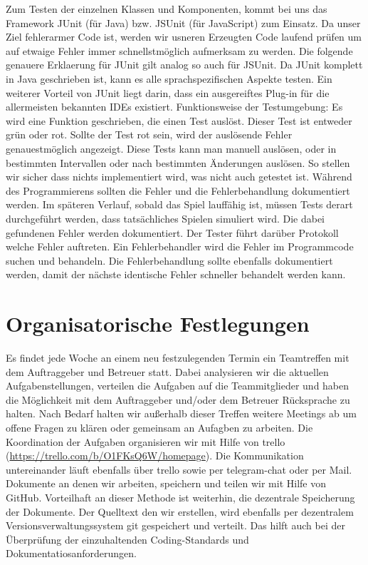 \documentclass[11pt,a4paper]{article}
\begin{document}
Zum Testen der einzelnen Klassen und Komponenten, kommt bei uns das Framework JUnit (für Java) bzw. JSUnit (für JavaScript) zum Einsatz. Da unser Ziel fehlerarmer Code ist, werden wir usneren Erzeugten Code laufend prüfen um auf etwaige Fehler immer schnellstmöglich aufmerksam zu werden. 
Die folgende genauere Erklaerung für JUnit gilt analog so auch für JSUnit.
Da JUnit komplett in Java geschrieben ist, kann es alle sprachspezifischen Aspekte testen. Ein weiterer Vorteil von JUnit liegt darin, dass ein ausgereiftes Plug-in für die allermeisten bekannten IDEs existiert. Funktionsweise der Testumgebung: Es wird eine Funktion geschrieben, die einen Test auslöst. Dieser Test ist entweder grün oder rot. Sollte der Test rot sein, wird der auslösende Fehler genauestmöglich angezeigt. Diese Tests kann man manuell auslösen, oder in bestimmten Intervallen oder nach bestimmten Änderungen auslösen. So stellen wir sicher dass nichts implementiert wird, was nicht auch getestet ist. Während des Programmierens sollten die Fehler und die Fehlerbehandlung dokumentiert werden.
Im späteren Verlauf, sobald das Spiel lauffähig ist, müssen Tests derart durchgeführt werden, dass tatsächliches Spielen simuliert wird. Die dabei gefundenen Fehler werden dokumentiert. Der Tester führt darüber Protokoll welche Fehler auftreten. Ein Fehlerbehandler wird die Fehler im Programmcode suchen und behandeln. Die Fehlerbehandlung sollte ebenfalls dokumentiert werden, damit der nächste identische Fehler schneller behandelt werden kann. 

\section{Organisatorische Festlegungen}

Es findet jede Woche an einem neu festzulegenden Termin ein Teamtreffen mit dem Auftraggeber und Betreuer statt. Dabei analysieren wir die aktuellen Aufgabenstellungen, verteilen die Aufgaben auf die Teammitglieder und haben die Möglichkeit mit dem Auftraggeber und/oder dem Betreuer Rücksprache zu halten. Nach Bedarf halten wir außerhalb dieser Treffen weitere Meetings ab um offene Fragen zu klären oder gemeinsam an Aufagben zu arbeiten. Die Koordination der Aufgaben organisieren wir mit Hilfe von trello (\url{https://trello.com/b/O1FKsQ6W/homepage}). Die Kommunikation untereinander läuft ebenfalls über trello sowie per telegram-chat oder per Mail. Dokumente an denen wir arbeiten, speichern und teilen wir mit Hilfe von GitHub. Vorteilhaft an dieser Methode ist weiterhin, die dezentrale Speicherung der Dokumente. Der Quelltext den wir erstellen, wird ebenfalls per dezentralem Versionsverwaltungssystem git gespeichert und verteilt. Das hilft auch bei der Überprüfung der einzuhaltenden Coding-Standards und Dokumentatiosanforderungen.
\end{document}

